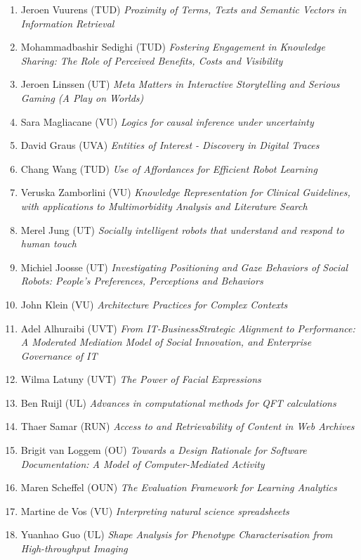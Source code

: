 \begin{multicols}{2}
\begin{scriptsize}
\begin{enumerate}[leftmargin=*,noitemsep,topsep=0pt,parsep=1pt,partopsep=0pt]
{}\item Jeroen Vuurens (TUD) \textit{Proximity of Terms, Texts and Semantic Vectors in Information Retrieval
}\item Mohammadbashir Sedighi (TUD) \textit{Fostering Engagement in Knowledge Sharing: The Role of Perceived Benefits, Costs and Visibility
}\item Jeroen Linssen (UT) \textit{Meta Matters in Interactive Storytelling and Serious Gaming (A Play on Worlds)
}\item Sara Magliacane (VU) \textit{Logics for causal inference under uncertainty 
}\item David Graus (UVA) \textit{Entities of Interest - Discovery in Digital Traces
}\item Chang Wang (TUD) \textit{Use of Affordances for Efficient Robot Learning
}\item Veruska Zamborlini (VU) \textit{Knowledge Representation for Clinical Guidelines, with applications to Multimorbidity Analysis and Literature Search
}\item Merel Jung (UT) \textit{Socially intelligent robots that understand and respond to human touch	
}\item Michiel Joosse (UT) \textit{Investigating Positioning and Gaze Behaviors of Social Robots: People's Preferences, Perceptions and Behaviors
}\item John Klein (VU) \textit{Architecture Practices for Complex Contexts
}\item Adel Alhuraibi (UVT) \textit{From IT-BusinessStrategic Alignment to Performance: A Moderated Mediation Model of Social Innovation, and Enterprise Governance of IT
}\item Wilma Latuny (UVT) \textit{The Power of Facial Expressions
}\item Ben Ruijl (UL) \textit{Advances in computational methods for QFT calculations
}\item Thaer Samar (RUN) \textit{Access to and Retrievability of Content in Web Archives
}\item Brigit van Loggem (OU) \textit{Towards a Design Rationale for Software Documentation: A Model of Computer-Mediated Activity
}\item Maren Scheffel (OUN) \textit{The Evaluation Framework for Learning Analytics
}\item Martine de Vos (VU) \textit{Interpreting natural science spreadsheets
}\item Yuanhao Guo (UL) \textit{Shape Analysis for Phenotype Characterisation from High-throughput Imaging
}
\end{enumerate}
\end{scriptsize}
\end{multicols}
